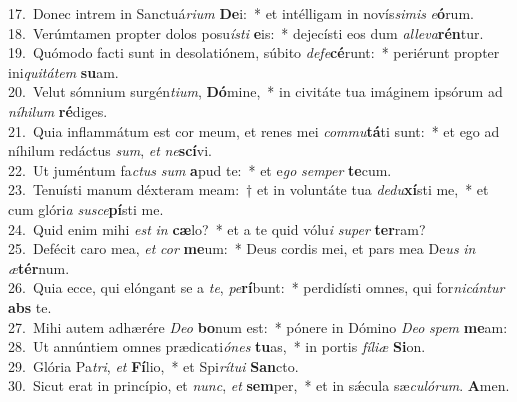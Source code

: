 {17.~}Donec intrem in Sanctuá\textit{ri}\textit{um} \textbf{De}i:~* et intélligam in novís\textit{si}\textit{mis} \textit{e}\textbf{ó}rum.\\
{18.~}Verúmtamen propter dolos posu\textit{í}\textit{sti} \textbf{e}is:~* dejecísti eos dum \textit{al}\textit{le}\textit{va}\textbf{rén}tur.\\
{19.~}Quómodo facti sunt in desolatiónem, súbito \textit{de}\textit{fe}\textbf{cé}runt:~* periérunt propter ini\textit{qui}\textit{tá}\textit{tem} \textbf{su}am.\\
{20.~}Velut sómnium surgén\textit{ti}\textit{um}, \textbf{Dó}mine,~* in civitáte tua imáginem ipsórum ad \textit{ní}\textit{hi}\textit{lum} \textbf{ré}diges.\\
{21.~}Quia inflammátum est cor meum, et renes mei \textit{com}\textit{mu}\textbf{tá}ti sunt:~* et ego ad níhilum redáctus \textit{sum}, \textit{et} \textit{ne}\textbf{scí}vi.\\
{22.~}Ut juméntum fa\textit{ctus} \textit{sum} \textbf{a}pud te:~* et e\textit{go} \textit{sem}\textit{per} \textbf{te}cum.\\
{23.~}Tenuísti manum déxteram meam:~† et in voluntáte tua \textit{de}\textit{du}\textbf{xí}sti me,~* et cum glóri\textit{a} \textit{su}\textit{sce}\textbf{pí}sti me.\\
{24.~}Quid enim mihi \textit{est} \textit{in} \textbf{cæ}lo?~* et a te quid vólu\textit{i} \textit{su}\textit{per} \textbf{ter}ram?\\
{25.~}Defécit caro mea, \textit{et} \textit{cor} \textbf{me}um:~* Deus cordis mei, et pars mea De\textit{us} \textit{in} \textit{æ}\textbf{tér}num.\\
{26.~}Quia ecce, qui elóngant se a \textit{te}, \textit{pe}\textbf{rí}bunt:~* perdidísti omnes, qui for\textit{ni}\textit{cán}\textit{tur} \textbf{abs} te.\\
{27.~}Mihi autem adhærére \textit{De}\textit{o} \textbf{bo}num est:~* pónere in Dómino \textit{De}\textit{o} \textit{spem} \textbf{me}am:\\
{28.~}Ut annúntiem omnes prædicati\textit{ó}\textit{nes} \textbf{tu}as,~* in portis \textit{fí}\textit{li}\textit{æ} \textbf{Si}on.\\
{29.~}Glória Pa\textit{tri}, \textit{et} \textbf{Fí}lio,~* et Spi\textit{rí}\textit{tu}\textit{i} \textbf{San}cto.\\
{30.~}Sicut erat in princípio, et \textit{nunc}, \textit{et} \textbf{sem}per,~* et in sǽcula sæ\textit{cu}\textit{ló}\textit{rum}. \textbf{A}men.\\
